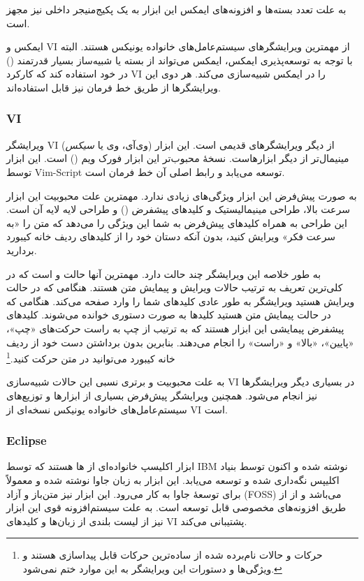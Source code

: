 \documentclass[a4paper]{article}
\begin{document}
به علت تعدد بسته‌ها و افزونه‌های ایمکس این ابزار به یک پکیج‌منیجر داخلی نیز مجهز است.

ایمکس و VI از مهمترین ویرایشگرهای سیستم‌عامل‌های خانواده یونیکس هستند. البته با توجه به توسعه‌پذیری ایمکس، ایمکس می‌تواند از بسته یا شبیه‌ساز بسیار قدرتمند  () در خود استفاده کند که کارکرد VI را در ایمکس شبیه‌سازی می‌کند.
هر دوی این ویرایشگرها از طریق خط فرمان نیز قابل استفاده‌اند.\cite{wp:emacs}

\subsubsection{VI}
ویرایشگر VI (وی‌آی، وی یا \textit{سیکس}) از دیگر ویرایشگرهای قدیمی است. این ابزار
مینیمال‌تر از دیگر ابزارهاست. نسخهٔ محبوب‌تر این ابزار فورک ویم () است.
این ابزار توسط Vim-Script توسعه می‌یابد و رابط اصلی آن خط فرمان است.

به صورت پیش‌فرض این ابزار ویژگی‌های زیادی ندارد. مهمترین علت محبوبیت این ابزار سرعت بالا، طراحی مینیمالیستیک و کلیدهای پیشفرض () و طراحی لایه لایه آن است.
این طراحی به همراه کلیدهای پیش‌فرض به شما این ویژگی را می‌دهد که متن را «به سرعت فکر» ویرایش کنید، بدون آنکه دستان خود را از کلیدهای ردیف خانه کیبورد بردارید.

به طور خلاصه این ویرایشگر چند حالت دارد. مهمترین آنها حالت  و  است که در کلی‌ترین تعریف به ترتیب حالات ویرایش و پیمایش متن هستند.
هنگامی که در حالت ویرایش هستید ویرایشگر به طور عادی کلیدهای شما را وارد صفحه می‌کند.
هنگامی که در حالت پیمایش متن هستید کلیدها به صورت دستوری خوانده می‌شوند.
کلیدهای پیشفرض پیمایشی این ابزار  هستند که به ترتیب از چپ به راست حرکت‌های «چپ»، «پایین»، «بالا» و «راست» را انجام می‌دهند. بنابرین بدون برداشتن دست خود
از ردیف خانه کیبورد می‌توانید در متن حرکت کنید.\footnote{حرکات و حالات نام‌برده شده از ساده‌ترین حرکات قابل پیداسازی هستند و ویژگی‌ها و دستورات این ویرایشگر به این موارد ختم نمی‌شود.}

به علت محبوبیت و برتری نسبی این حالات شبیه‌سازی VI در بسیاری دیگر ویرایشگرها نیز
انجام می‌شود. همچنین ویرایشگر پیش‌فرض بسیاری از ابزارها و توزیع‌های سیستم‌عامل‌های خانواده یونیکس نسخه‌ای از VI است.\cite{wp:vim}

\subsubsection{Eclipse}
ابزار اکلیسپ خانواده‌ای از ها هستند که توسط IBM نوشته شده و اکنون توسط بنیاد
اکلیپس نگه‌داری شده و توسعه می‌یابد. این ابزار به زبان جاوا نوشته شده و معمولاً برای
توسعهٔ جاوا به کار می‌رود.
این ابزار نیز متن‌باز و آزاد (FOSS) می‌باشد و از از طریق افزونه‌های مخصوصی قابل توسعه است.
به علت سیستم‌افزونه قوی این ابزار نیز از لیست بلندی از زبان‌ها و کلیدهای VI پشتیبانی می‌کند.\cite{wp:eclipse}
\end{document}
